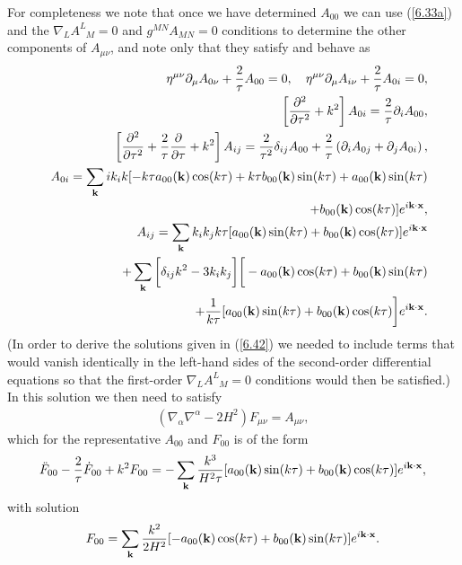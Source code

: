 For completeness we note that once we have determined $A_{00}$ we can use (\ref{6.33a}) and the $\nabla_{L}A^{L}_{\phantom{L}M}=0$ and $g^{MN}A_{MN}=0$ conditions to determine the other components of $A_{\mu\nu}$, and note only that they satisfy and behave as  
%
\begin{eqnarray}
&&
\eta^{\mu\nu}\partial_{\mu}A_{0\nu}+\frac{2}{\tau}A_{00}=0,\quad \eta^{\mu\nu}\partial_{\mu}A_{i\nu}+\frac{2}{\tau}A_{0i}=0,
\nonumber\\
&&\left[\frac{\partial^2}{\partial\tau^2}+k^2\right]A_{0i}=\frac{2}{\tau}\partial_iA_{00},
\nonumber\\
&&\left[\frac{\partial^2}{\partial\tau^2}+\frac{2}{\tau}\frac{\partial}{\partial \tau}+k^2\right]A_{ij} =\frac{2}{\tau^2}\delta_{ij}A_{00}+\frac{2}{\tau}\left(\partial_iA_{0j}+\partial_jA_{0i}\right),
\nonumber\\
&&A_{0i}=\sum_{\bf k} ik_ik[-k\tau a_{00}({\bf k})\cos(k\tau)+k\tau b_{00} ({\bf k})\sin(k\tau)
+a_{00}({\bf k})\sin(k\tau)
\nonumber\\
&&\qquad+b_{00} ({\bf k})\cos(k\tau)]e^{i{\bf k}\cdot {\bf x}}, 
\nonumber\\
&&A_{ij}=\sum_{\bf k}k_ik_jk\tau[a_{00}({\bf k})\sin(k\tau)+b_{00} ({\bf k})\cos(k\tau)]e^{i{\bf k}\cdot {\bf x}}
\nonumber\\
&&\qquad+\sum_{\bf k}\bigg[\delta_{ij}k^2-3k_ik_j\bigg]\bigg[-a_{00} ({\bf k})\cos(k\tau)+b_{00}({\bf k})\sin(k\tau)
\nonumber\\
&&\qquad+\frac{1}{k\tau}[a_{00} ({\bf k})\sin(k\tau)+b_{00}({\bf k})\cos(k\tau)
\bigg]e^{i{\bf k}\cdot {\bf x}}.
\label{6.42}
\end{eqnarray}
%
(In order to derive the solutions given in (\ref{6.42}) we needed to include terms that would vanish identically in the left-hand sides of the second-order differential equations so that the first-order $\nabla_{L}A^{L}_{\phantom{L}M}=0$ conditions would then be satisfied.) In this solution we then need to satisfy 
%
\begin{eqnarray}
(\nabla_{\alpha}\nabla^{\alpha}-2H^2)F_{\mu\nu}=A_{\mu\nu},
\label{6.43}
\end{eqnarray}
%
which for the representative $A_{00}$ and $F_{00}$ is of the form
%
\begin{eqnarray}
\ddot{F}_{00}-\frac{2}{\tau}\dot{F}_{00}+k^2F_{00}=-\sum_{\bf k}\frac{k^3}{H^2\tau} [a_{00}({\bf k})\sin(k\tau)+b_{00} ({\bf k})\cos(k\tau)]e^{i{\bf k}\cdot {\bf x}},
\label{6.44}
\end{eqnarray}
% 
with solution
%
\begin{eqnarray}
F_{00}=\sum_{\bf k}\frac{k^2}{2H^2} [-a_{00}({\bf k})\cos(k\tau)+b_{00} ({\bf k})\sin(k\tau)]e^{i{\bf k}\cdot {\bf x}}.
\label{6.45}
\end{eqnarray}
% 


